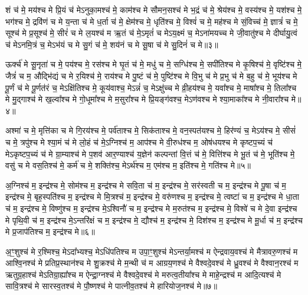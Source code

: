 शं च॑ मे॒ मय॑श्च मे प्रि॒यं च॑ मेऽनुका॒मश्च॑ मे॒ काम॑श्च मे सौमन॒सश्च॑ मे भ॒द्रं च॑ मे॒ श्रेय॑श्च मे॒ वस्य॑श्च मे॒ यश॑श्च मे॒ भग॑श्च मे॒ द्रवि॑णं च मे य॒न्ता च॑ मे ध॒र्ता च॑ मे॒ क्षेम॑श्च मे॒ धृति॑श्च मे॒ विश्वं॑ च मे॒ मह॑श्च मे सं॒विच्च॑ मे॒ ज्ञात्रं॑ च मे॒ सूश्च॑ मे प्र॒सूश्च॑ मे॒ सीरं॑ च मे ल॒यश्च॑ म ऋ॒तं च॑ मे॒ऽमृतं॑ च मेऽय॒क्ष्मं च॒ मेऽना॑मयच्च मे जी॒वातु॑श्च मे दीर्घायु॒त्वं च॑ मेऽनमि॒त्रं च॒ मेऽभ॑यं च मे सु॒गं च॑ मे॒ शय॑नं च मे सू॒षा च॑ मे सु॒दिनं॑ च मे॥३॥ 

ऊर्क्च॑ मे सू॒नृता॑ च मे॒ पय॑श्च मे॒ रस॑श्च मे घृ॒तं च॑ मे॒ मधु॑ च मे॒ सग्धि॑श्च मे॒ सपी॑तिश्च मे कृ॒षिश्च॑ मे॒ वृष्टि॑श्च मे॒ जैत्रं॑ च म॒ औद्भि॑द्यं च मे र॒यिश्च॑ मे॒ राय॑श्च मे पु॒ष्टं च॑ मे॒ पुष्टि॑श्च मे वि॒भु च॑ मे प्र॒भु च॑ मे ब॒हु च॑ मे॒ भूय॑श्च मे पू॒र्णं च॑ मे पू॒र्णत॑रं च॒ मेऽक्षि॑तिश्च मे॒ कूय॑वाश्च॒ मेऽन्नं॑ च॒ मेऽक्षु॑च्च मे व्री॒हय॑श्च मे॒ यवा᳚श्च मे॒ माषा᳚श्च मे॒ तिला᳚श्च मे मु॒द्गाश्च॑ मे ख॒ल्वा᳚श्च मे गो॒धूमा᳚श्च मे म॒सुरा᳚श्च मे प्रि॒यङ्ग॑वश्च॒ मेऽण॑वश्च मे श्या॒माका᳚श्च मे नी॒वारा᳚श्च मे॥४॥ 

अश्मा॑ च मे॒ मृत्ति॑का च मे गि॒रय॑श्च मे॒ पर्व॑ताश्च मे॒ सिक॑ताश्च मे॒ वन॒स्पत॑यश्च मे॒ हिर॑ण्यं च॒ मेऽय॑श्च मे॒ सीसं॑ च मे॒ त्रपु॑श्च मे श्या॒मं च॑ मे लो॒हं च॑ मे॒ऽग्निश्च॑ म॒ आप॑श्च मे वी॒रुध॑श्च म॒ ओष॑धयश्च मे कृष्टप॒च्यं च॑ मेऽकृष्टप॒च्यं च॑ मे ग्रा॒म्याश्च॑ मे प॒शव॑ आर॒ण्याश्च॑ य॒ज्ञेन॑ कल्पन्तां वि॒त्तं च॑ मे॒ वित्ति॑श्च मे भू॒तं च॑ मे॒ भूति॑श्च मे॒ वसु॑ च मे वस॒तिश्च॑ मे॒ कर्म॑ च मे॒ शक्ति॑श्च॒ मेऽर्थ॑श्च म॒ एम॑श्च म॒ इति॑श्च मे॒ गति॑श्च मे॥५॥ 

अ॒ग्निश्च॑ म॒ इन्द्र॑श्च मे॒ सोम॑श्च म॒ इन्द्र॑श्च मे सवि॒ता च॑ म॒ इन्द्र॑श्च मे॒ सर॑स्वती च म॒ इन्द्र॑श्च मे पू॒षा च॑ म॒ इन्द्र॑श्च मे॒ बृह॒स्पति॑श्च म॒ इन्द्र॑श्च मे मि॒त्रश्च॑ म॒ इन्द्र॑श्च मे॒ वरु॑णश्च म॒ इन्द्र॑श्च मे॒ त्वष्टा॑ च म॒ इन्द्र॑श्च मे धा॒ता च॑ म॒ इन्द्र॑श्च मे॒ विष्णु॑श्च म॒ इन्द्र॑श्च मे॒ऽश्विनौ॑ च म॒ इन्द्र॑श्च मे म॒रुत॑श्च म॒ इन्द्र॑श्च मे॒ विश्वे॑ च मे दे॒वा इन्द्र॑श्च मे पृथि॒वी च॑ म॒ इन्द्र॑श्च मे॒ऽन्तरि॑क्षं च म॒ इन्द्र॑श्च मे॒ द्यौश्च॑ म॒ इन्द्र॑श्च मे॒ दिश॑श्च म॒ इन्द्र॑श्च मे मू॒र्धा च॑ म॒ इन्द्र॑श्च मे प्र॒जाप॑तिश्च म॒ इन्द्र॑श्च मे॥६॥ 

अ॒ꣳ॒शुश्च॑ मे र॒श्मिश्च॒ मेऽदा᳚भ्यश्च॒ मेऽधि॑पतिश्च म उपा॒ꣳ॒शुश्च॑ मेऽन्तर्या॒मश्च॑ म ऐन्द्रवाय॒वश्च॑ मे मैत्रावरु॒णश्च॑ म आश्वि॒नश्च॑ मे प्रतिप्र॒स्थान॑श्च मे शु॒क्रश्च॑ मे म॒न्थी च॑ म आग्रय॒णश्च॑ मे वैश्वदे॒वश्च॑ मे ध्रु॒वश्च॑ मे वैश्वान॒रश्च॑ म ऋतुग्र॒हाश्च॑ मेऽतिग्रा॒ह्या᳚श्च म ऐन्द्रा॒ग्नश्च॑ मे वैश्वदे॒वश्च॑ मे मरुत्व॒तीया᳚श्च मे माहे॒न्द्रश्च॑ म आदि॒त्यश्च॑ मे सावि॒त्रश्च॑ मे सारस्व॒तश्च॑ मे पौ॒ष्णश्च॑ मे पात्नीव॒तश्च॑ मे हारियोज॒नश्च॑ मे॥७॥ 

